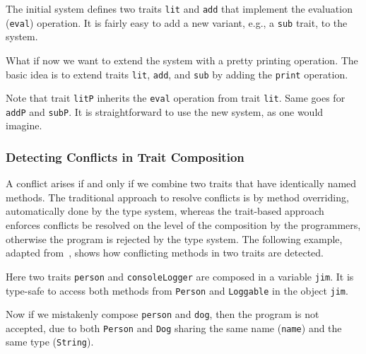 
The initial system defines two traits \lstinline$lit$ and \lstinline$add$ that
implement the evaluation (\lstinline{eval}) operation. It is fairly easy to add
a new variant, e.g., a \lstinline$sub$ trait, to the system.


What if now we want to extend the system with a pretty printing operation. The
basic idea is to extend traits \lstinline$lit$, \lstinline$add$, and
\lstinline$sub$ by adding the \lstinline$print$ operation.


Note that trait \lstinline$litP$ inherits the \lstinline$eval$ operation from
trait \lstinline$lit$. Same goes for \lstinline$addP$ and \lstinline$subP$. It
is straightforward to use the new system, as one would imagine.



\subsubsection{Detecting Conflicts in Trait Composition}

A conflict arises if and only if we combine two traits that have identically
named methods. The traditional approach to resolve conflicts is by method
overriding, automatically done by the type system, whereas the trait-based
approach enforces conflicts be resolved on the level of the composition by the
programmers, otherwise the program is rejected by the type system. The following
example, adapted from~\cite{alpuimdisjoint}, shows how conflicting methods in
two traits are detected.


Here two traits \lstinline{person} and \lstinline{consoleLogger} are composed in
a variable \lstinline{jim}. It is type-safe to access both methods from
\lstinline{Person} and \lstinline{Loggable} in the object \lstinline{jim}.

Now if we mistakenly compose \lstinline$person$ and \lstinline$dog$, then the
program is not accepted, due to both \lstinline{Person} and \lstinline{Dog}
sharing the same name (\lstinline{name}) and the same type (\lstinline$String$).

